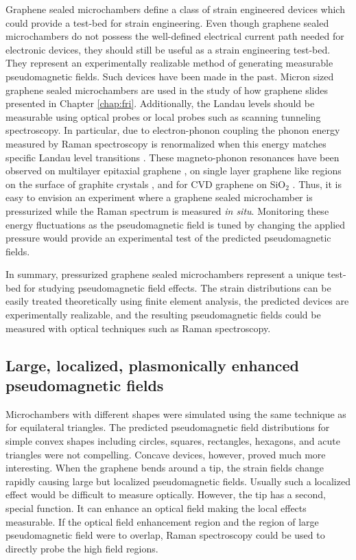 Graphene sealed microchambers define a class of strain engineered devices which could provide a test-bed for strain engineering.
Even though graphene sealed microchambers do not possess the well-defined electrical current path needed for electronic devices, they should still be useful as a strain engineering test-bed.
They represent an experimentally realizable method of generating measurable pseudomagnetic fields.
Such devices have been made in the past.
Micron sized graphene sealed microchambers are used in the study of how graphene slides presented in Chapter \ref{chap:fri}.
Additionally, the Landau levels should be measurable using optical probes or local probes such as scanning tunneling spectroscopy.
In particular, due to electron-phonon coupling the phonon energy measured by Raman spectroscopy is renormalized when this energy matches specific Landau level transitions \cite{Goerbig2011}.
These magneto-phonon resonances have been observed on multilayer epitaxial graphene \cite{Faugeras2009}, on single layer graphene like regions on the surface of graphite crystals \cite{Faugeras2011}, and for CVD graphene on SiO$_2$ \cite{Kim2013}.
Thus, it is easy to envision an experiment where a graphene sealed microchamber is pressurized while the Raman spectrum is measured \emph{in situ}.
Monitoring these energy fluctuations as the pseudomagnetic field is tuned by changing the applied pressure would provide an experimental test of the predicted pseudomagnetic fields.

In summary, pressurized graphene sealed microchambers represent a unique test-bed for studying pseudomagnetic field effects.
The strain distributions can be easily treated theoretically using finite element analysis, the predicted devices are experimentally realizable, and the resulting pseudomagnetic fields could be measured with optical techniques such as Raman spectroscopy.

\subsection{Large, localized, plasmonically enhanced pseudomagnetic fields}
Microchambers with different shapes were simulated using the same technique as for equilateral triangles.
The predicted pseudomagnetic field distributions for simple convex shapes including circles, squares, rectangles, hexagons, and acute triangles were not compelling.
Concave devices, however, proved much more interesting.
When the graphene bends around a tip, the strain fields change rapidly causing large but localized pseudomagnetic fields.
Usually such a localized effect would be difficult to measure optically.
However, the tip has a second, special function.
It can enhance an optical field making the local effects measurable.
If the optical field enhancement region and the region of large pseudomagnetic field were to overlap, Raman spectroscopy could be used to directly probe the high field regions. 

